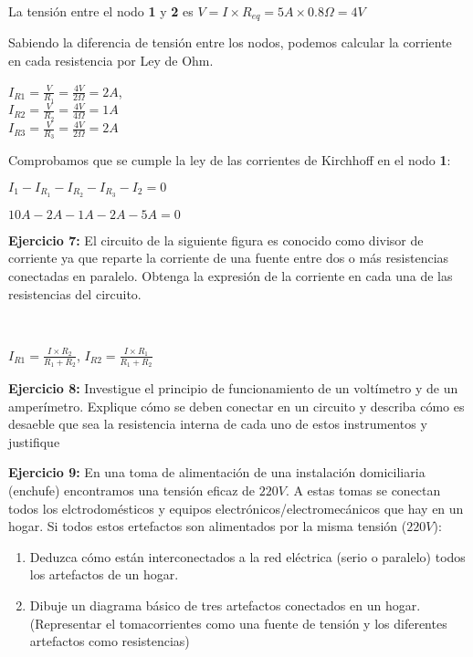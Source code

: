 \documentclass[11pt]{article}
\begin{document}
    La tensión entre el nodo \textbf{1} y \textbf{2} es
\(V=I \times R_{eq} = 5A \times 0.8 \Omega = 4V\)

    Sabiendo la diferencia de tensión entre los nodos, podemos calcular la
corriente en cada resistencia por Ley de Ohm.

\(I_{R1} = \frac{V}{R_{1}}=\frac{4V}{2\Omega}=2A\),\\
\(I_{R2} = \frac{V}{R_{2}}=\frac{4V}{4\Omega}=1A\)\\
\(I_{R3} = \frac{V}{R_{3}}=\frac{4V}{2\Omega}=2A\)

Comprobamos que se cumple la ley de las corrientes de Kirchhoff en el
nodo \textbf{1}:

\(I_1-I_{R_1}-I_{R_2}-I_{R_3}-I_2=0\)

\(10A-2A-1A-2A-5A=0\)

    \textbf{Ejercicio 7:} El circuito de la siguiente figura es conocido
como divisor de corriente ya que reparte la corriente de una fuente
entre dos o más resistencias conectadas en paralelo. Obtenga la
expresión de la corriente en cada una de las resistencias del circuito.

    \begin{center}
    \end{center}
    { \hspace*{\fill} \\}
    
    \(I_{R1}=\frac{I \times R_{2}}{R_1+R_2}\),
\(I_{R2}=\frac{I \times R_{1}}{R_1+R_2}\)

\textbf{Ejercicio 8:} Investigue el principio de funcionamiento de un
voltímetro y de un amperímetro. Explique cómo se deben conectar en un
circuito y describa cómo es desaeble que sea la resistencia interna de
cada uno de estos instrumentos y justifique

    \textbf{Ejercicio 9:} En una toma de alimentación de una instalación
domiciliaria (enchufe) encontramos una tensión eficaz de \(220 V\). A
estas tomas se conectan todos los elctrodomésticos y equipos
electrónicos/electromecánicos que hay en un hogar. Si todos estos
ertefactos son alimentados por la misma tensión (\(220V\)):

\begin{enumerate}
\def\labelenumi{\alph{enumi})}
\item
  Deduzca cómo están interconectados a la red eléctrica (serio o
  paralelo) todos los artefactos de un hogar.
\item
  Dibuje un diagrama básico de tres artefactos conectados en un hogar.
  (Representar el tomacorrientes como una fuente de tensión y los
  diferentes artefactos como resistencias)
\end{enumerate}
\end{document}
